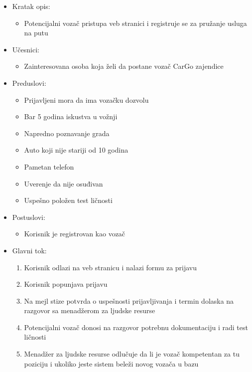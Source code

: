 \begin{itemize}
	\item Kratak opis:
		\begin{itemize}
			\item Potencijalni vozač pristupa veb stranici i registruje se za pružanje usluga na putu
		\end{itemize}
 
	\item Učesnici:
		\begin{itemize}
			\item Zainteresovana osoba koja želi da postane vozač CarGo zajendice
		\end{itemize}				

	\item Preduslovi:
		\begin{itemize}
		    \item Prijavljeni mora da ima vozačku dozvolu
		    \item Bar 5 godina iskustva u vožnji
		    \item Napredno poznavanje grada
		    \item Auto koji nije stariji od 10 godina
		    \item Pametan telefon
		    \item Uverenje da nije osuđivan
		    \item Uspešno položen test ličnosti
		\end{itemize}

	\item Postuslovi:
		\begin{itemize}
			\item Korisnik je registrovan kao vozač
		\end{itemize}		


	\item Glavni tok:
		\begin{enumerate}
		    \item Korisnik odlazi na veb stranicu i nalazi formu za prijavu
		    \item Korisnik popunjava prijavu
		    \item Na mejl stize potvrda o uspešnosti prijavljivanja i termin dolaska na razgovor sa menadžerom za ljudske resurse
		    \item Potencijalni vozač donosi na razgovor potrebnu dokumentaciju i radi test ličnosti
		    \item Menadžer za ljudske resurse odlučuje da li je vozač kompetentan za tu poziciju i ukoliko jeste sistem beleži novog vozača u bazu
		\end{enumerate}


\end{itemize}
